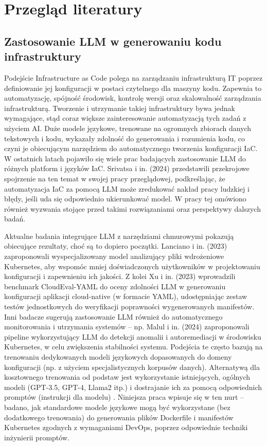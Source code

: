 \clearpage %
\section{Przegląd literatury}

\subsection{Zastosowanie LLM w generowaniu kodu infrastruktury}

Podejście Infrastructure as Code polega na zarządzaniu infrastrukturą IT poprzez definiowanie jej konfiguracji w postaci czytelnego dla maszyny kodu. Zapewnia to automatyzację, spójność środowisk, kontrolę wersji oraz skalowalność zarządzania infrastrukturą. Tworzenie i utrzymanie takiej infrastruktury bywa jednak wymagające, stąd coraz większe zainteresowanie automatyzacją tych zadań z użyciem AI. Duże modele językowe, trenowane na ogromnych zbiorach danych tekstowych i kodu, wykazały zdolność do generowania i rozumienia kodu, co czyni je obiecującym narzędziem do automatycznego tworzenia konfiguracji IaC. W ostatnich latach pojawiło się wiele prac badających zastosowanie LLM do różnych platform i języków IaC. Srivatsa i in. (2024) \cite{srivatsa_survey_2024} przedstawili przekrojowe spojrzenie na ten temat w swojej pracy przeglądowej, podkreślając, że automatyzacja IaC za pomocą LLM może zredukować nakład pracy ludzkiej i błędy, jeśli uda się odpowiednio ukierunkować model. W pracy tej omówiono również wyzwania stojące przed takimi rozwiązaniami oraz perspektywy dalszych badań.

Aktualne badania integrujące LLM z narzędziami chmurowymi pokazują obiecujące rezultaty, choć są to dopiero początki. Lanciano i in. (2023) \cite{lanciano_analyzing_2023} zaproponowali wyspecjalizowany model analizujący pliki wdrożeniowe Kubernetes, aby wspomóc mniej doświadczonych użytkowników w projektowaniu konfiguracji i zapewnieniu ich jakości. Z kolei Xu i in. (2023) \cite{ueno_migrating_2024} wprowadzili benchmark CloudEval-YAML do oceny zdolności LLM w generowaniu konfiguracji aplikacji cloud-native (w formacie YAML), udostępniając zestaw testów jednostkowych do weryfikacji poprawności wygenerowanych manifestów. Inni badacze sugerują zastosowanie LLM również do automatycznego monitorowania i utrzymania systemów – np. Malul i in. (2024) \cite{malul_genkubesec_2024} zaproponowali pipeline wykorzystujący LLM do detekcji anomalii i autoremediacji w środowisku Kubernetes, w celu zwiększenia stabilności systemu. Podejścia te często bazują na trenowaniu dedykowanych modeli językowych dopasowanych do domeny konfiguracji (np. z użyciem specjalistycznych korpusów danych). Alternatywą dla kosztownego trenowania od podstaw jest wykorzystanie istniejących, ogólnych modeli (GPT-3.5, GPT-4, Llama2 itp.) i dostrajanie \cite{liu_pre-train_2023} ich za pomocą odpowiednich promptów (instrukcji dla modelu) \cite{kratzke_dont_2024}. Niniejsza praca wpisuje się w ten nurt – badano, jak standardowe modele językowe mogą być wykorzystane (bez dodatkowego trenowania) do generowania plików Dockerfile i manifestów Kubernetes zgodnych z wymaganiami DevOps, poprzez odpowiednie techniki inżynierii promptów.

